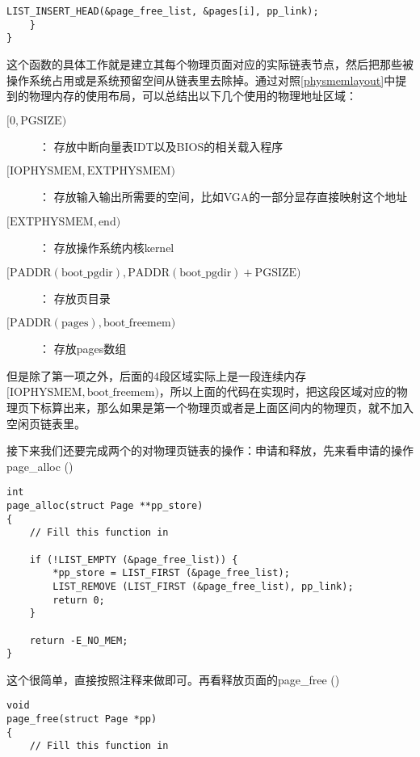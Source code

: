 \documentclass{article}
\newcommand{\funcname}[1]{{\ttfamily \small #1}}
\begin{document}
\begin{CJK*}{UTF8}{gkai}
\begin{lstlisting}[style=ccode, title={\scriptsize \ttfamily \bfseries kern/pmap.c: boot\_init ()}]
        LIST_INSERT_HEAD(&page_free_list, &pages[i], pp_link);
    }
}
\end{lstlisting}

这个函数的具体工作就是建立其每个物理页面对应的实际链表节点，然后把那些被操作系统占用或是系统预留空间从链表里去除掉。通过对照\ref{physmemlayout}中提到的物理内存的使用布局，可以总结出以下几个使用的物理地址区域：


\begin{description}
\item[$[0, \mathrm{PGSIZE})$] ：\newline
存放中断向量表IDT以及BIOS的相关载入程序
\item[$[\mathrm{IOPHYSMEM}, \mathrm{EXTPHYSMEM})$]：\newline
存放输入输出所需要的空间，比如VGA的一部分显存直接映射这个地址
\item[$[\mathrm{EXTPHYSMEM}, \mathrm{end})$]：\newline
存放操作系统内核kernel
\item[$[\mathrm{PADDR(boot\_pgdir)}, \mathrm{PADDR(boot\_pgdir) + \mathrm{PGSIZE}})$]：\newline
存放页目录
\item[$[\mathrm{PADDR(pages)}, \mathrm{boot\_freemem})$]：\newline
存放pages数组
\end{description}

但是除了第一项之外，后面的4段区域实际上是一段连续内存$[\mathrm{IOPHYSMEM}, \mathrm{boot\_freemem})$，所以上面的代码在实现时，把这段区域对应的物理页下标算出来，那么如果是第一个物理页或者是上面区间内的物理页，就不加入空闲页链表里。

接下来我们还要完成两个的对物理页链表的操作：申请和释放，先来看申请的操作\funcname{page\_alloc ()}

\begin{lstlisting}[style=ccode, title={\scriptsize \ttfamily \bfseries kern/pmap.c: page\_alloc ()}]
int
page_alloc(struct Page **pp_store)
{
    // Fill this function in
 	
    if (!LIST_EMPTY (&page_free_list)) {
        *pp_store = LIST_FIRST (&page_free_list);
        LIST_REMOVE (LIST_FIRST (&page_free_list), pp_link);
        return 0;
    }

    return -E_NO_MEM;
}
\end{lstlisting}

这个很简单，直接按照注释来做即可。再看释放页面的\funcname{page\_free ()}

\begin{lstlisting}[style=ccode, title={\scriptsize \ttfamily \bfseries kern/pmap.c: page\_free ()}]
void
page_free(struct Page *pp)
{
    // Fill this function in
	

\end{lstlisting}
\end{CJK*}
\end{document}
